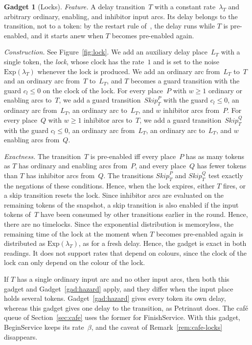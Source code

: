 \documentclass[11pt]{article}
\theoremstyle{definition}
\newtheorem{gadget}{Gadget}
\begin{document}
\begin{gadget}[Locks]\label{gad:lock}
  \emph{Feature.} A delay transition~$T$ with a constant rate~$\lambda_T$
  and arbitrary ordinary, enabling, and inhibitor input arcs. Its delay
  belongs to the transition, not to a token: by the restart rule
  of~\cite{EverdijBlom2005}, the delay runs while $T$ is pre-enabled, and it
  starts anew when $T$ becomes pre-enabled again.

  \emph{Construction.} See Figure~\ref{fig:lock}. We add an auxiliary delay
  place~$L_T$ with a single token, the \emph{lock}, whose clock has the
  rate~$1$ and is set to the noise $\mathrm{Exp}(\lambda_T)$ whenever the lock
  is produced. We add an ordinary arc from~$L_T$ to~$T$ and an ordinary arc
  from~$T$ to~$L_T$, and $T$ becomes a guard transition with the guard
  $c_l \le 0$ on the clock of the lock. For every place~$P$ with $w \ge 1$
  ordinary or enabling arcs to~$T$, we add a guard
  transition~$\mathit{Skip}^P_T$ with the guard $c_l \le 0$, an ordinary arc
  from~$L_T$, an ordinary arc to~$L_T$, and $w$ inhibitor arcs from~$P$. For
  every place~$Q$ with $w \ge 1$ inhibitor arcs to~$T$, we add a guard
  transition~$\mathit{Skip}^Q_T$ with the guard $c_l \le 0$, an ordinary arc
  from~$L_T$, an ordinary arc to~$L_T$, and $w$ enabling arcs from~$Q$.

  \emph{Exactness.} The transition~$T$ is pre-enabled iff every place~$P$
  has as many tokens as $T$ has ordinary and enabling arcs from~$P$, and
  every place~$Q$ has fewer tokens than $T$ has inhibitor arcs from~$Q$. The
  transitions $\mathit{Skip}^P_T$ and $\mathit{Skip}^Q_T$ test exactly the
  negations of these conditions. Hence, when the lock expires, either $T$
  fires, or a skip transition resets the lock. Since inhibitor arcs are
  evaluated on the remaining tokens of the snapshot, a skip transition is
  also enabled if the input tokens of~$T$ have been consumed by other
  transitions earlier in the round. Hence, there are no timelocks. Since the
  exponential distribution is memoryless, the remaining time of the lock at
  the moment when $T$ becomes pre-enabled again is distributed as
  $\mathrm{Exp}(\lambda_T)$, as for a fresh delay. Hence, the gadget is exact
  in both readings. It does not support rates that depend on colours, since
  the clock of the lock can only depend on the colour of the lock.

  If $T$ has a single ordinary input arc and no other input arcs, then both
  this gadget and Gadget~\ref{gad:hazard} apply, and they differ when the
  input place holds several tokens. Gadget~\ref{gad:hazard} gives every
  token its own delay, whereas this gadget gives one delay to the
  transition, as Petrinaut does. The café queue of Section~\ref{sec:cafe}
  uses the former for FinishService. With this gadget, BeginService keeps
  its rate~$\beta$, and the caveat of Remark~\ref{rem:cafe-locks}
  disappears.
\end{gadget}
\end{document}
